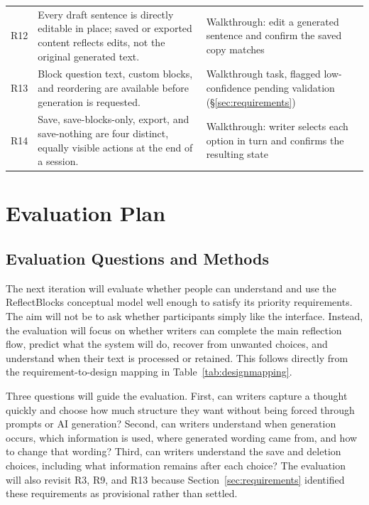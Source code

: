 \documentclass[sigconf,nonacm]{acmart}
\begin{document}
\begin{table}[tb]
\begin{tabularx}{\textwidth}{@{}l X X@{}}
    R12 & Every draft sentence is directly editable in place; saved or exported content reflects edits, not the original generated text. & Walkthrough: edit a generated sentence and confirm the saved copy matches \\
    R13 & Block question text, custom blocks, and reordering are available before generation is requested. & Walkthrough task, flagged low-confidence pending validation (\S\ref{sec:requirements}) \\
    R14 & Save, save-blocks-only, export, and save-nothing are four distinct, equally visible actions at the end of a session. & Walkthrough: writer selects each option in turn and confirms the resulting state \\
    \bottomrule
  \end{tabularx}
\end{table}

\section{Evaluation Plan}
\label{sec:evaluation}

\subsection{Evaluation Questions and Methods}

The next iteration will evaluate whether people can understand and use the
ReflectBlocks conceptual model well enough to satisfy its priority requirements.
The aim will not be to ask whether participants simply like the interface.
Instead, the evaluation will focus on whether writers can complete the main
reflection flow, predict what the system will do, recover from unwanted choices,
and understand when their text is processed or retained. This follows directly
from the requirement-to-design mapping in Table~\ref{tab:designmapping}.

Three questions will guide the evaluation. First, can writers capture a thought
quickly and choose how much structure they want without being forced through
prompts or AI generation? Second, can writers understand when generation occurs,
which information is used, where generated wording came from, and how to change
that wording? Third, can writers understand the save and deletion choices,
including what information remains after each choice? The evaluation will also
revisit R3, R9, and R13 because Section~\ref{sec:requirements} identified these
requirements as provisional rather than settled.
\end{document}
